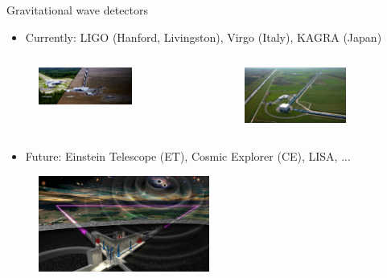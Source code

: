 \documentclass[usenames,dvipsnames,t]{beamer}
\begin{document}
\begin{frame}{Gravitational wave detectors}

  \begin{itemize}
    \item Currently: LIGO (Hanford, Livingston), Virgo (Italy), KAGRA (Japan)
  \end{itemize}

  \begin{columns}
    
    \begin{figure}[H]
      \centering
      \includegraphics[width=0.75\textwidth]{Figures/ifo-Livingston-Hanford.jpeg}
    \end{figure}

    \begin{figure}[H]
      \centering
      \includegraphics[width=0.75\textwidth]{Figures/Virgo.jpeg}
    \end{figure}
  \end{columns}

  \begin{itemize}
    \item Future: Einstein Telescope (ET), Cosmic Explorer (CE), LISA, ...
  \end{itemize}
  \begin{figure}
    \centering
    \includegraphics[width=0.5\textwidth]{Figures/einstein-telescope.jpeg}
  \end{figure}
  
\end{frame}
\end{document}

